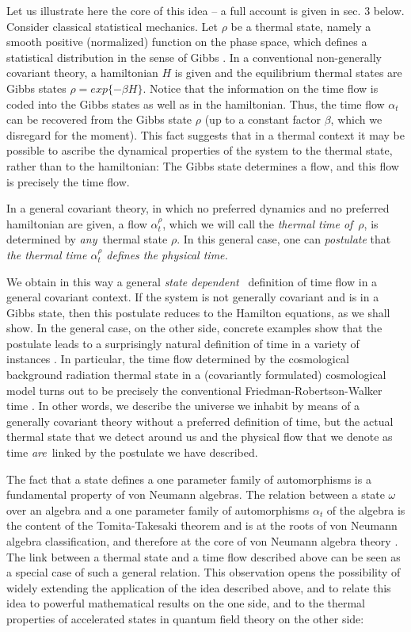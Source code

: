 Let us illustrate here the core of this idea -- a full account is
given in sec. 3 below.  Consider classical statistical mechanics.
Let $\rho$ be a thermal state, namely a smooth positive
(normalized) function on the phase space, which defines a
statistical distribution in the sense of Gibbs \cite{Gibbs}.  In a
conventional non-generally covariant theory, a hamiltonian $H$ is
given and the equilibrium thermal states are Gibbs states $\rho =
exp\{ - \beta H\}$.   Notice that the information on the time flow
is coded into the Gibbs states as well as in the hamiltonian.
Thus, the time flow $\alpha_t$ can be recovered from the Gibbs
state $\rho$  (up to a constant factor $\beta$, which we
disregard for the
moment).   This fact suggests that in a thermal context it may
be possible to ascribe the dynamical properties of the system to
the thermal state, rather than to the hamiltonian:  The Gibbs
state determines a flow, and this flow is precisely the time
flow.

In a general covariant theory, in which no preferred dynamics and
no preferred hamiltonian are given, a flow $\alpha_t^\rho$, which
we will call the {\it thermal time of\,} $\rho$, is determined by
{\it any\,} thermal state $\rho$.  In this general case, one can {\it
postulate}  \cite{statistical} that {\it the thermal time
$\alpha_t^\rho$ defines the physical
time.}

We obtain in this way a general {\it state dependent\ } definition
of time flow in a general covariant context.  If the system is not
generally covariant and is in a Gibbs state, then this postulate
reduces to the Hamilton equations, as we shall show.  In the
general case, on the other side, concrete examples show that the
postulate leads to a surprisingly natural definition of time in a
variety of instances \cite{statistical2}.  In particular, the time
flow determined by the cosmological background radiation
thermal state in a (covariantly formulated) cosmological model
turns out to be precisely the conventional
Friedman-Robertson-Walker time \cite{statistical2}.   In other
words, we describe the universe we inhabit by means of a
generally covariant theory without a preferred definition of time,
but the actual thermal state that we detect around us and the
physical flow that we denote as time {\it are\,} linked by the
postulate we have described.

The fact that a state defines a one parameter family of
automorphisms is a fundamental property of von Neumann
algebras.  The relation between a state $\omega$ over an algebra
and
a one parameter family of automorphisms $\alpha_t$ of the
algebra is the content of the Tomita-Takesaki theorem and is
at the roots of von
Neumann algebra classification, and therefore at the core of von
Neumann algebra theory \cite{al}.   The link between a thermal
state and a
time flow described above can be seen as a special case of such a
general relation.  This observation opens the possibility of widely
extending the application of the idea described above, and to
relate this idea to powerful mathematical results on the one side,
and to the thermal properties of accelerated states in quantum
field theory on the other side:

